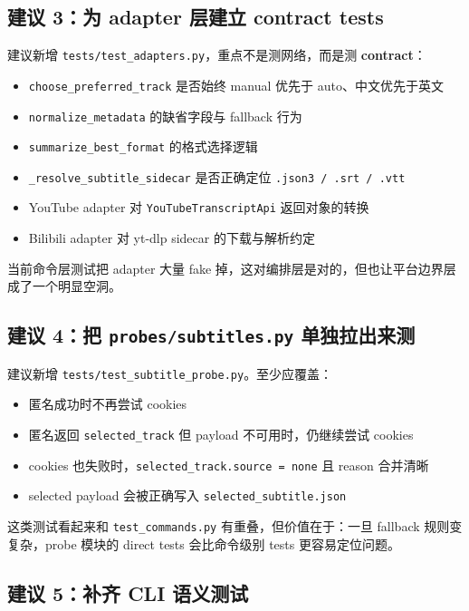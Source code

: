 \documentclass[a4paper]{article}
\begin{document}
\subsection{建议 3：为 adapter 层建立 contract tests}

建议新增 \texttt{tests/test\_adapters.py}，重点不是测网络，而是测 \textbf{contract}：

\begin{itemize}
\item \texttt{choose\_preferred\_track} 是否始终 manual 优先于 auto、中文优先于英文
\item \texttt{normalize\_metadata} 的缺省字段与 fallback 行为
\item \texttt{summarize\_best\_format} 的格式选择逻辑
\item \texttt{\_resolve\_subtitle\_sidecar} 是否正确定位 \texttt{.json3 / .srt / .vtt}
\item YouTube adapter 对 \texttt{YouTubeTranscriptApi} 返回对象的转换
\item Bilibili adapter 对 yt-dlp sidecar 的下载与解析约定
\end{itemize}

当前命令层测试把 adapter 大量 fake 掉，这对编排层是对的，但也让平台边界层成了一个明显空洞。

\subsection{建议 4：把 \texttt{probes/subtitles.py} 单独拉出来测}

建议新增 \texttt{tests/test\_subtitle\_probe.py}。至少应覆盖：

\begin{itemize}
\item 匿名成功时不再尝试 cookies
\item 匿名返回 \texttt{selected\_track} 但 payload 不可用时，仍继续尝试 cookies
\item cookies 也失败时，\texttt{selected\_track.source = none} 且 reason 合并清晰
\item selected payload 会被正确写入 \texttt{selected\_subtitle.json}
\end{itemize}

这类测试看起来和 \texttt{test\_commands.py} 有重叠，但价值在于：一旦 fallback 规则变复杂，probe 模块的 direct tests 会比命令级别 tests 更容易定位问题。

\subsection{建议 5：补齐 CLI 语义测试}
\end{document}
